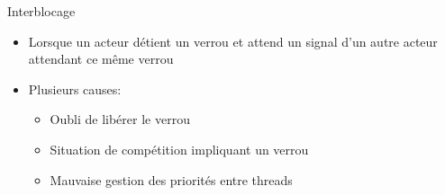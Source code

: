 \begin{frame}{Interblocage}
	\begin{itemize}
		\item
			Lorsque un acteur détient un verrou et attend un signal d'un autre acteur attendant ce même verrou
		\item
			Plusieurs causes:
			\begin{itemize}
			\item
				Oubli de libérer le verrou
			\item
				Situation de compétition impliquant un verrou
			\item
				Mauvaise gestion des priorités entre threads
		\end{itemize}
	\end{itemize}
\end{frame}
